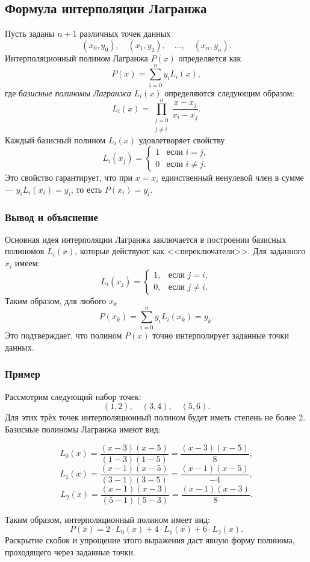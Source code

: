 
\subsection{Формула интерполяции Лагранжа}
Пусть заданы \(n+1\) различных точек данных
\[
(x_0, y_0), \quad (x_1, y_1), \quad \dots, \quad (x_n, y_n).
\]
Интерполяционный полином Лагранжа \(P(x)\) определяется как
\[
P(x) = \sum_{i=0}^{n} y_i L_i(x),
\]
где \emph{базисные полиномы Лагранжа} \(L_i(x)\) определяются следующим образом:
\[
L_i(x) = \prod_{\substack{j=0 \\ j \neq i}}^{n} \frac{x - x_j}{x_i - x_j}.
\]
Каждый базисный полином \(L_i(x)\) удовлетворяет свойству
\[
L_i(x_j) = \begin{cases}
1 & \text{если } i = j, \\
0 & \text{если } i \neq j.
\end{cases}
\]
Это свойство гарантирует, что при \(x = x_i\) единственный ненулевой член в сумме --- \(y_i L_i(x_i)=y_i\), то есть \(P(x_i)=y_i\).

\subsubsection{Вывод и объяснение}
Основная идея интерполяции Лагранжа заключается в построении базисных полиномов \(L_i(x)\), которые действуют как <<переключатели>>. Для заданного \(x_i\) имеем:
\[
L_i(x_j) =
\begin{cases}
1, & \text{если } j=i, \\
0, & \text{если } j\neq i.
\end{cases}
\]
Таким образом, для любого \(x_k\)
\[
P(x_k) = \sum_{i=0}^{n} y_i L_i(x_k) = y_k.
\]
Это подтверждает, что полином \(P(x)\) точно интерполирует заданные точки данных.

\subsubsection{Пример}
Рассмотрим следующий набор точек:
\[
(1,2), \quad (3,4), \quad (5,6).
\]
Для этих трёх точек интерполяционный полином будет иметь степень не более 2. Базисные полиномы Лагранжа имеют вид:

\[
L_0(x) = \frac{(x-3)(x-5)}{(1-3)(1-5)} = \frac{(x-3)(x-5)}{8},
\]
\[
L_1(x) = \frac{(x-1)(x-5)}{(3-1)(3-5)} = \frac{(x-1)(x-5)}{-4},
\]
\[
L_2(x) = \frac{(x-1)(x-3)}{(5-1)(5-3)} = \frac{(x-1)(x-3)}{8}.
\]

Таким образом, интерполяционный полином имеет вид:
\[
P(x) = 2\cdot L_0(x) + 4\cdot L_1(x) + 6\cdot L_2(x).
\]
Раскрытие скобок и упрощение этого выражения даст явную форму полинома, проходящего через заданные точки.


